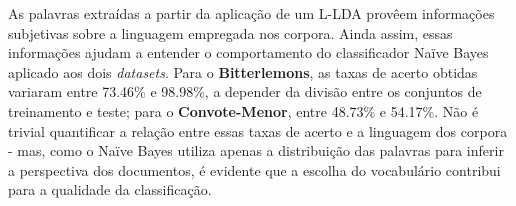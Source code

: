 






As palavras extraídas a partir da aplicação de um L-LDA provêem informações subjetivas sobre a linguagem empregada nos corpora. Ainda assim, essas informações ajudam a entender o comportamento do classificador Naïve Bayes aplicado aos dois \emph{datasets}. Para o \textbf{Bitterlemons}, as taxas de acerto obtidas variaram entre 73.46\% e 98.98\%, a depender da divisão entre os conjuntos de treinamento e teste; para o \textbf{Convote-Menor}, entre 48.73\% e 54.17\%. Não é trivial quantificar a relação entre essas taxas de acerto e a linguagem dos corpora - mas, como o Naïve Bayes utiliza apenas a distribuição das palavras para inferir a perspectiva dos documentos, é evidente que a escolha do vocabulário contribui para a qualidade da classificação.




